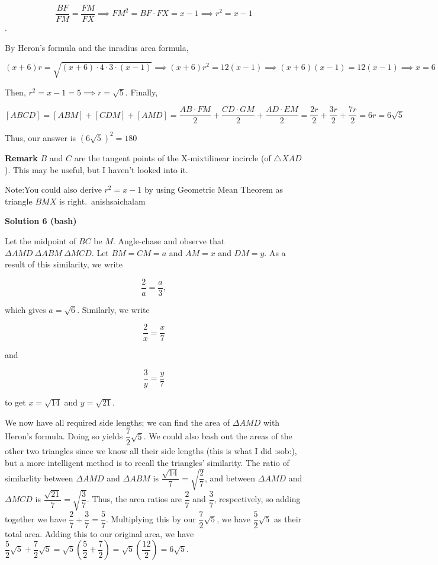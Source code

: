\begin{enumerate}
 
 \[\frac{BF}{FM} = \frac{FM}{FX} \implies {FM}^2 = BF \cdot FX = x - 1 \implies r^2 = x - 1\].

 By Heron's formula and the inradius area formula,

 
 \[(x+6)r = \sqrt{(x+6)\cdot 4 \cdot 3 \cdot (x-1)} \implies (x+6)r^2 = 12(x-1) \implies (x+6)(x-1) = 12(x-1) \implies x=6\]

 Then,  $r^2 = x - 1 = 5 \implies r = \sqrt{5}$. Finally,

 
 \[[ABCD] = [ABM] + [CDM] + [AMD] = \frac{AB \cdot FM}{2} + \frac{CD \cdot GM}{2} + \frac{AD \cdot EM}{2} = \frac{2r}{2} + \frac{3r}{2} + \frac{7r}{2} = 6r = 6\sqrt{5}\]

 Thus, our answer is $(6\sqrt{5})^{2} = \boxed{180}$

 \textbf{Remark} $B$ and $C$ are the tangent points of the X-mixtilinear incircle (of $\triangle{XAD}$). This may be useful, but I haven't looked into it.

 Note:You could also derive $r^2 = x - 1$ by using Geometric Mean Theorem as triangle $BMX$ is right.~anishsaichalam

 



\textbf{Solution 6 (bash)}

Let the midpoint of $BC$ be $M$. Angle-chase and observe that $\Delta AMD~\Delta ABM~\Delta MCD$. Let $BM=CM=a$ and $AM=x$ and $DM=y$. As a result of this similarity, we write 

 
 \[\dfrac2a=\dfrac a3,\]

 which gives $a=\sqrt 6$. Similarly, we write 

 
 \[\dfrac2x=\dfrac x7\]

 and 

 
 \[\dfrac3y=\dfrac y7\]

 to get $x=\sqrt{14}$ and $y=\sqrt{21}$. 

 We now have all required side lengths; we can find the area of $\Delta AMD$ with Heron's formula. Doing so yields $\dfrac72\sqrt5$. We could also bash out the areas of the other two triangles since we know all their side lengths (this is what I did :sob:), but a more intelligent method is to recall the triangles' similarity. The ratio of similarlity between $\Delta AMD$ and $\Delta ABM$ is $\dfrac{\sqrt{14}}7=\sqrt{\dfrac27}$, and between $\Delta AMD$ and $\Delta MCD$ is $\dfrac{\sqrt{21}}7=\sqrt{\dfrac37}$. Thus, the area ratios are $\dfrac27$ and $\dfrac37$, respectively, so adding together we have $\dfrac27+\dfrac37=\dfrac57$. Multiplying this by our $\dfrac72\sqrt5$, we have $\dfrac52\sqrt5$ as their total area. Adding this to our original area, we have $\dfrac52\sqrt5+\dfrac72\sqrt5=\sqrt5\left(\dfrac52+\dfrac72\right)=\sqrt5\left(\dfrac{12}2\right)=6\sqrt5$. 


\end{enumerate}
